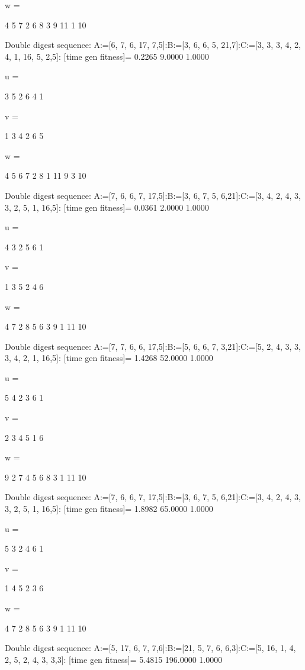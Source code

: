 w =

     4     5     7     2     6     8     3     9    11     1    10

Double digest sequence:
A:=[6, 7, 6, 17, 7,5]:B:=[3, 6, 6, 5, 21,7]:C:=[3, 3, 3, 4, 2, 4, 1, 16, 5, 2,5]:
[time gen fitness]=
    0.2265    9.0000    1.0000


u =

     3     5     2     6     4     1


v =

     1     3     4     2     6     5


w =

     4     5     6     7     2     8     1    11     9     3    10

Double digest sequence:
A:=[7, 6, 6, 7, 17,5]:B:=[3, 6, 7, 5, 6,21]:C:=[3, 4, 2, 4, 3, 3, 2, 5, 1, 16,5]:
[time gen fitness]=
    0.0361    2.0000    1.0000


u =

     4     3     2     5     6     1


v =

     1     3     5     2     4     6


w =

     4     7     2     8     5     6     3     9     1    11    10

Double digest sequence:
A:=[7, 7, 6, 6, 17,5]:B:=[5, 6, 6, 7, 3,21]:C:=[5, 2, 4, 3, 3, 3, 4, 2, 1, 16,5]:
[time gen fitness]=
    1.4268   52.0000    1.0000


u =

     5     4     2     3     6     1


v =

     2     3     4     5     1     6


w =

     9     2     7     4     5     6     8     3     1    11    10

Double digest sequence:
A:=[7, 6, 6, 7, 17,5]:B:=[3, 6, 7, 5, 6,21]:C:=[3, 4, 2, 4, 3, 3, 2, 5, 1, 16,5]:
[time gen fitness]=
    1.8982   65.0000    1.0000


u =

     5     3     2     4     6     1


v =

     1     4     5     2     3     6


w =

     4     7     2     8     5     6     3     9     1    11    10

Double digest sequence:
A:=[5, 17, 6, 7, 7,6]:B:=[21, 5, 7, 6, 6,3]:C:=[5, 16, 1, 4, 2, 5, 2, 4, 3, 3,3]:
[time gen fitness]=
    5.4815  196.0000    1.0000


